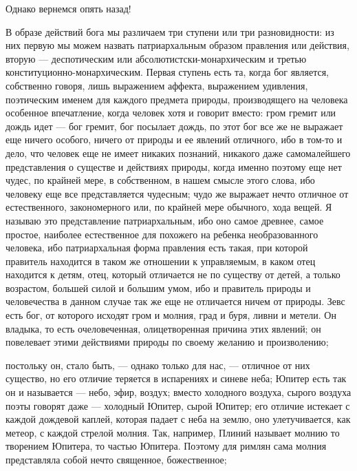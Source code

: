 \documentclass[12pt]{article}
\begin{document}
Однако вернемся опять назад! 

В образе действий бога мы различаем три ступени или три разновидности: из них первую мы можем назвать патриархальным образом правления или действия, вторую --- деспотическим или абсолютистски-монархическим и третью конституционно-монархическим. Первая ступень есть та, когда бог является, собственно говоря, лишь выражением аффекта, выражением удивления, поэтическим именем для каждого предмета природы, производящего на человека особенное впечатление, когда человек хотя и говорит вместо: гром гремит или дождь идет --- бог гремит, бог посылает дождь, по этот бог все же не выражает еще ничего особого, ничего от природы и ее явлений отличного, ибо в том-то и дело, что человек еще не имеет никаких познаний, никакого даже самомалейшего представления о существе и действиях природы, когда именно поэтому еще нет чудес, по крайней мере, в собственном, в нашем смысле этого слова, ибо человеку еще все представляется чудесным; чудо же выражает нечто отличное от естественного, закономерного или, по крайней мере обычного, хода вещей. Я называю это представление патриархальным, ибо оно самое древнее, самое простое, наиболее естественное для похожего на ребенка необразованного человека, ибо патриархальная форма правления есть такая, при которой правитель находится в таком же отношении к управляемым, в каком отец находится к детям, отец, который отличается не по существу от детей, а только возрастом, большей силой и большим умом, ибо и правитель природы и человечества в данном случае так же еще не отличается ничем от природы. Зевс есть бог, от которого исходят гром и молния, град и буря, ливни и метели. Он владыка, то есть очеловеченная, олицетворенная причина этих явлений; он повелевает этими действиями природы по своему желанию и произволению; 

постольку он, стало быть, --- однако только для нас, --- отличное от них существо, но его отличие теряется в испарениях и синеве неба; Юпитер есть так он и называется --- небо, эфир, воздух; вместо холодного воздуха, сырого воздуха поэты говорят даже --- холодный Юпитер, сырой Юпитер; его отличие истекает с каждой дождевой каплей, которая падает с неба на землю, оно улетучивается, как метеор, с каждой стрелой молния. Так, например, Плиний называет молнию то творением Юпитера, то частью Юпитера. Поэтому для римлян сама молния представляла собой нечто священное, божественное; 
\end{document}
